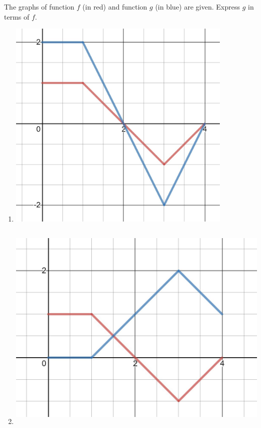\documentclass{ximera}
\begin{document}
\begin{problem}\label{prob:160hom3prob2}
The graphs of function $f$ (in red) and function $g$ (in blue) are given. Express $g$ in terms of $f$.
\begin{enumerate}
    \item \begin{image}
   \includegraphics[height=4in]{160H3pic4.jpg}
 \end{image}
 \begin{multipleChoice}  
  \end{multipleChoice}
  
   \item \begin{image}
   \includegraphics[height=4in]{160H3pic2.jpg}
 \end{image}
 \begin{multipleChoice}  
  \end{multipleChoice}
  

\end{enumerate}
\end{problem}
\end{document}
